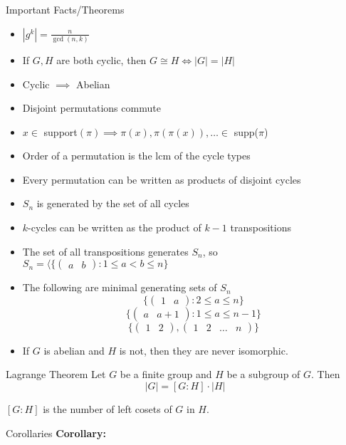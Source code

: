\documentclass{article}
\begin{document}
\begin{multicols*}{3}
\begin{blackbox}{Important Facts/Theorems}
\begin{itemize}
        \item $|g^k| = \frac{n}{\gcd(n,k)}$
        \item If $G,H$ are both cyclic, then $G \cong H \iff |G| = |H|$
        \item Cyclic $\implies$ Abelian
        \item Disjoint permutations commute
        \item $x \in $ support$(\pi) \implies \pi(x), \pi(\pi(x)), \ldots \in$ supp($\pi$)
        \item Order of a permutation is the lcm of the cycle types
        \item Every permutation can be written as products of disjoint cycles
        \item $S_n$ is generated by the set of all cycles
        \item $k$-cycles can be written as the product of $k - 1$ transpositions
        \item The set of all transpositions generates $S_n$, so $S_n = \langle \{\begin{pmatrix}
            a & b
        \end{pmatrix}: 1 \leq a < b \leq n\}$
        \item The following are minimal generating sets of $S_n$
        \[\{\begin{pmatrix}
            1 & a
        \end{pmatrix}: 2 \leq a \leq n\}\]
        \[\{\begin{pmatrix}
            a & a+1
        \end{pmatrix}: 1 \leq a \leq n-1\}\]
        \[\{\begin{pmatrix}
            1 & 2
        \end{pmatrix}, \begin{pmatrix}
            1 & 2 & \ldots & n
        \end{pmatrix}\}\]
        \item If $G$ is abelian and $H$ is not, then they are never isomorphic.
    \end{itemize}
\end{blackbox}
\begin{blackbox}{Lagrange Theorem}
    Let $G$ be a finite group and $H$ be a subgroup of $G$. Then\\[-2ex]
    \[|G| = [G : H] \cdot |H|\]
    \raggedright
    $[G:H]$ is the number of left cosets of $G$ in $H$.
    \begin{bluebox}{Corollaries}
        \textbf{Corollary:}\\[-2ex]

\end{bluebox}
\end{blackbox}
\end{multicols*}
\end{document}

